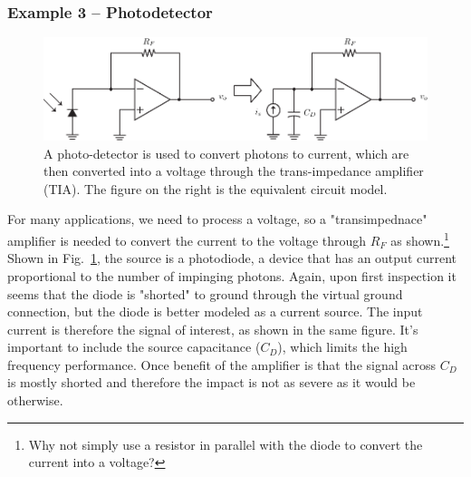 \subsubsection{Example 3 – Photodetector}
\begin{figure}[tb]
\centering
\includegraphics[width=.8\columnwidth]{ex_photodetect}
\caption{A photo-detector is used to convert photons to current, which are then converted into a voltage through the trans-impedance amplifier (TIA).  The figure on the right is the equivalent circuit model.} \label{fig:pd_detect}
\end{figure}
For many applications, we need to process a voltage, so a "transimpednace" amplifier is needed to convert the current to the voltage through $R_F$ as shown.\footnote{Why not simply use a resistor in parallel with the diode to convert the current into a voltage?}
Shown in Fig.~\ref{fig:pd_detect}, the source is a photodiode, a device that has an output current proportional to the number of impinging photons.  Again, upon first inspection it seems that the diode is "shorted" to ground through the virtual ground connection, but the diode is better modeled as a current source.  The input current is therefore the signal of interest, as shown in the same figure.  It's important to include the source capacitance ($C_D$), which limits the high frequency performance.  Once benefit of the amplifier is that the signal across $C_D$ is mostly shorted and therefore the impact is not as severe as it would be otherwise.
